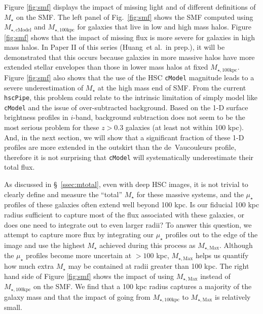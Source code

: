 \documentclass[a4paper,fleqn,usenatbib]{mnras}
\def\etal{{\ et al.~}}
\def\ser{{S\'{e}rsic\ }}
\def\cmodel{\texttt{cModel}}
\def\mstar{{$M_{\star}$}}
\def\mtot{{$M_{\star,100\mathrm{kpc}}$}}
\def\mmax{{$M_{\star,\mathrm{Max}}$}}
\def\mcmodel{{$M_{\star,\mathrm{cModel}}$}}
\def\mden{{$\mu_{\star}$}}
\begin{document}
     Figure \ref{fig:smf} displays the impact of missing light and of different 
     definitions of \mstar{} on the SMF. 
     The left panel of Fig.~\ref{fig:smf} shows the SMF computed using \mcmodel{} 
     and \mtot{} for galaxies that live in low and high mass halos.  
     Figure \ref{fig:smf} shows that the impact of missing flux is more severe for  
     galaxies in high mass halos. 
     In Paper II of this series (Huang\etal in prep.), it will be demonstrated that 
     this occurs because galaxies in more massive halos have more extended stellar 
     envelopes than those in lower mass halos at fixed \mtot{}. 
     Figure \ref{fig:smf} also shows that the use of the HSC \texttt{cModel} 
     magnitude leads to a severe underestimation of \mstar{} at the high mass end 
     of SMF. 
     From the current \texttt{hscPipe}, this problem could relate to the intrinsic 
     limitation of simply model like \cmodel{} and the issue of over-subtracted 
     background. 
     Based on the 1-D surface brightness profiles in $i$-band, background subtraction
     does not seem to be the most serious problem for these $z>0.3$ galaxies 
     (at least not within 100 kpc). 
     And, in the next section, we will show that a significant fraction of these 
     1-D profiles are more extended in the outskirt than the de~Vaucouleurs profile, 
     therefore it is not surprising that \cmodel{} will systematically underestimate 
     their total flux.
     
    
    As discussed in \S~\ref{ssec:mtotal}, even with deep HSC images,
    it is not trivial to clearly define and measure the ``total'' \mstar{} for 
    these massive systems, and the \mden{} profiles of these galaxies often extend 
    well beyond 100 kpc. 
    Is our fiducial 100 kpc radius sufficient to capture most of the flux associated 
    with these galaxies, or does one need to integrate out to even larger radii? 
    To answer this question, we attempt to capture more flux by integrating our 
    \mden{} profiles out to the edge of the image and use the highest \mstar{} 
    achieved during this process as \mmax{}.
    Although the \mden{} profiles become more uncertain at $>100$ kpc, \mmax{} helps 
    us quantify how much extra \mstar{} may be contained at radii greater than 100 kpc.  
    The right hand side of Figure \ref{fig:smf} shows the impact of using \mmax{} 
    instead of  \mtot{} on the SMF.  
    We find that a 100 kpc radius captures a majority of the galaxy mass and that the 
    impact of going from \mtot{} to \mmax{} is relatively small.
    
\end{document}
